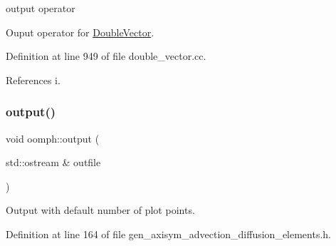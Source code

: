 output operator 

Ouput operator for \hyperlink{classoomph_1_1DoubleVector}{Double\+Vector}. 

Definition at line 949 of file double\+\_\+vector.\+cc.



References i.

\mbox{\label{namespaceoomph_a2473930e2634d673e2a3bed63b6851f0}} 
\subsubsection{\texorpdfstring{output()}{output()}\hspace{0.1cm}{\footnotesize\ttfamily [1/4]}}
{\footnotesize\ttfamily void oomph\+::output (\begin{DoxyParamCaption}\item[{std\+::ostream \&}]{outfile }\end{DoxyParamCaption})}



Output with default number of plot points. 



Definition at line 164 of file gen\+\_\+axisym\+\_\+advection\+\_\+diffusion\+\_\+elements.\+h.



